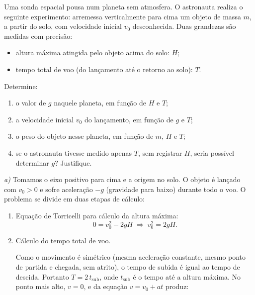 \begin{exemplo}\label{exemplo_dinamicanewton_p=mg03}

Uma sonda espacial pousa num planeta sem atmosfera. O astronauta realiza
o seguinte experimento: arremessa verticalmente para cima um objeto de
massa $m$, a partir do solo, com velocidade inicial $v_0$
desconhecida. Duas grandezas são medidas com precisão:

\begin{itemize}
  \item altura máxima atingida pelo objeto acima do solo: $H$;
  \item tempo total de voo (do lançamento até o retorno ao solo): $T$.
\end{itemize}

\noindent Determine:

\begin{enumerate}
  \item [a)] o valor de $g$ naquele planeta, em função de $H$ e $T$;
  \item [b)] a velocidade inicial $v_0$ do lançamento, em função de $g$ e $T$;
  \item [c)] o peso do objeto nesse planeta, em função de $m$, $H$ e $T$;
  \item [d)] se o astronauta tivesse medido apenas $T$, sem registrar $H$,
  seria possível determinar $g$? Justifique.
\end{enumerate}

\resolucao



\noindent\textit{a)} Tomamos o eixo positivo para cima e a origem no solo. O objeto é
lançado com $v_0 > 0$ e sofre aceleração $-g$ (gravidade para baixo)
durante todo o voo. O problema se divide em duas etapas de cálculo:

\begin{enumerate}
    \item [(i)] Equação de Torricelli para cálculo da altura máxima:
    \begin{equation}
      0 = v_0^2 - 2gH \;\Longrightarrow\; v_0^2 = 2gH.  
      \label{eq_dinamicanewton_eqintermediariaexemplopeson31}
    \end{equation}
   



    \item [(ii)] Cálculo do tempo total de voo.

Como o movimento é simétrico (mesma aceleração constante, mesmo ponto
de partida e chegada, sem atrito), o tempo de subida é igual ao tempo
de descida. Portanto $T = 2\,t_{\text{sub}}$, onde $t_{\text{sub}}$ é
o tempo até a altura máxima. No ponto mais alto, $v = 0$, e da equação
$v = v_0 + at$ produz:


\end{enumerate}
\end{exemplo}
